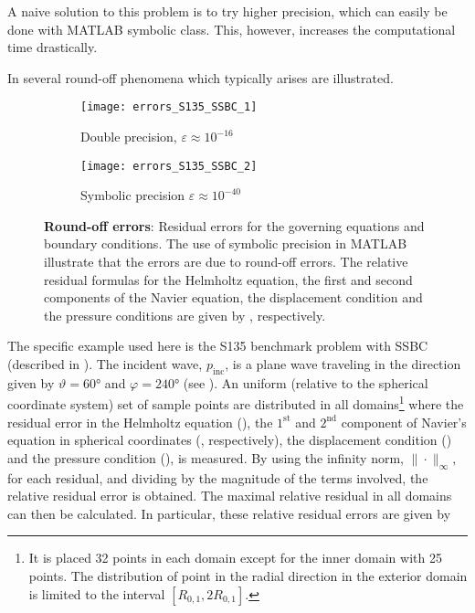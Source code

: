 A naive solution to this problem is to try higher precision, which can easily be done with MATLAB symbolic class. This, however, increases the computational time drastically. 

In  several round-off phenomena which typically arises are illustrated.
\begin{figure}
	\centering
	\begin{subfigure}[t]{0.49\textwidth}
		\texttt{[image: errors\_S135\_SSBC\_1]}
		\caption{Double precision, $\varepsilon \approx 10^{-16}$}
	\end{subfigure}%
	\hspace*{0.02\textwidth}%
	\begin{subfigure}[t]{0.49\textwidth}
		\texttt{[image: errors\_S135\_SSBC\_2]}
		\caption{Symbolic precision $\varepsilon \approx 10^{-40}$}
	\end{subfigure}
	\caption{\textbf{Round-off errors}: Residual errors for the governing equations and boundary conditions. The use of symbolic precision in MATLAB illustrate that the errors are due to round-off errors. The relative residual formulas for the Helmholtz equation, the first and second components of the Navier equation, the displacement condition and the pressure conditions are given by , respectively.}
	\label{Fig1:errorsS123_ASI-6NN}
\end{figure}
The specific example used here is the S135 benchmark problem with SSBC (described in ). The incident wave, $p_{\mathrm{inc}}$, is a plane wave traveling in the direction given by $\vartheta=\ang{60}$ and $\varphi=\ang{240}$ (see ). An uniform (relative to the spherical coordinate system) set of sample points are distributed in all domains\footnote{It is placed 32 points in each domain except for the inner domain with 25 points. The distribution of point in the radial direction in the exterior domain is limited to the interval $[R_{0,1}, 2R_{0,1}]$.} where the residual error in the Helmholtz equation (), the $1^{\mathrm{st}}$ and $2^{\mathrm{nd}}$ component of Navier's equation in spherical coordinates (, respectively), the displacement condition () and the pressure condition (), is measured. By using the infinity norm, $\|\cdot\|_\infty$, for each residual, and dividing by the magnitude of the terms involved, the relative residual error is obtained. The maximal relative residual in all domains can then be calculated. In particular, these relative residual errors are given by
